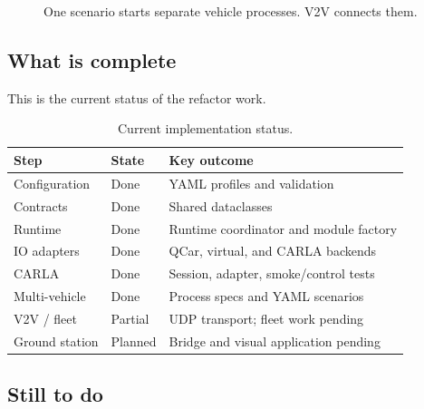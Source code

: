 \documentclass[11pt,a4paper]{article}
\begin{document}
\begin{figure}[H]
{
}
\caption{One scenario starts separate vehicle processes. V2V connects them.}
\label{fig:multi}
\end{figure}

\subsection{What is complete}

This is the current status of the refactor work.

\begin{table}[H]
\centering\scriptsize
\setlength{\tabcolsep}{2pt}
\begin{tabular}{@{}p{2.0cm}p{1.1cm}p{4.5cm}@{}}
\toprule
\textbf{Step} & \textbf{State} & \textbf{Key outcome} \\
\midrule
Configuration & Done & YAML profiles and validation \\
Contracts & Done & Shared dataclasses \\
Runtime & Done & Runtime coordinator and module factory \\
IO adapters & Done & QCar, virtual, and CARLA backends \\
CARLA & Done & Session, adapter, smoke/control tests \\
Multi-vehicle & Done & Process specs and YAML scenarios \\
V2V / fleet & Partial & UDP transport; fleet work pending \\
Ground station & Planned & Bridge and visual application pending \\
\bottomrule
\end{tabular}
\caption{Current implementation status.}
\label{tab:status}
\end{table}

\subsection{Still to do}
\end{document}

